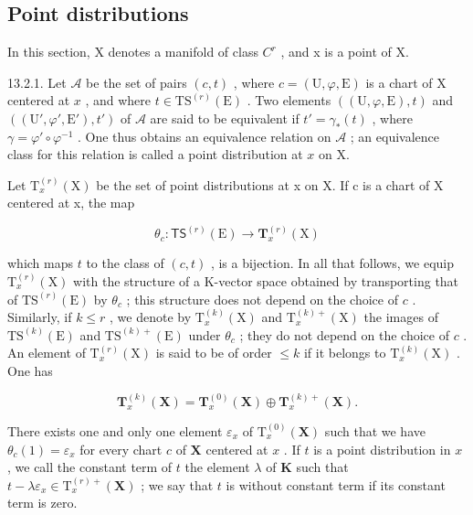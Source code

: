 \subsection{Point distributions}

In this section, X denotes a manifold of class \(C^{r}\) , and x is a point of X.

13.2.1. Let \(\mathcal{A}\) be the set of pairs \((c, t)\) , where \(c = (\mathrm{U}, \varphi, \mathrm{E})\) is a chart of X centered at \(x\) , and where \(t \in \mathrm{TS}^{(r)}(\mathrm{E})\) . Two elements \(((\mathrm{U}, \varphi, \mathrm{E}), t)\) and \(((\mathrm{U}', \varphi', \mathrm{E}'), t')\) of \(\mathcal{A}\) are said to be equivalent if \(t' = \gamma_*(t)\) , where \(\gamma = \varphi' \circ \varphi^{-1}\) . One thus obtains an equivalence relation on \(\mathcal{A}\) ; an equivalence class for this relation is called a point distribution at \(x\) on X.

Let \(\mathrm{T}_{x}^{(r)}(\mathrm{X})\) be the set of point distributions at x on X. If c is a chart of X centered at x, the map

\[
\theta_ {c} \colon \mathsf {T S} ^ {(r)} (\mathrm{E}) \to \mathbf {T} _ {x} ^ {(r)} (\mathrm{X})
\]

which maps \(t\) to the class of \((c, t)\) , is a bijection. In all that follows, we equip \(\mathrm{T}_{x}^{(r)}(\mathrm{X})\) with the structure of a K-vector space obtained by transporting that of \(\mathrm{TS}^{(r)}(\mathrm{E})\) by \(\theta_{c}\) ; this structure does not depend on the choice of \(c\) . Similarly, if \(k \leqslant r\) , we denote by \(\mathrm{T}_{x}^{(k)}(\mathrm{X})\) and \(\mathrm{T}_{x}^{(k)+}(\mathrm{X})\) the images of \(\mathrm{TS}^{(k)}(\mathrm{E})\) and \(\mathrm{TS}^{(k)+}(\mathrm{E})\) under \(\theta_{c}\) ; they do not depend on the choice of \(c\) . An element of \(\mathrm{T}_{x}^{(r)}(\mathrm{X})\) is said to be of order \(\leqslant k\) if it belongs to \(\mathrm{T}_{x}^{(k)}(\mathrm{X})\) . One has

\[
\mathbf {T} _ {x} ^ {(k)} (\mathbf {X}) = \mathbf {T} _ {x} ^ {(0)} (\mathbf {X}) \oplus \mathbf {T} _ {x} ^ {(k) +} (\mathbf {X}).
\]

There exists one and only one element \(\varepsilon_x\) of \(\mathrm{T}_x^{(0)}(\mathbf{X})\) such that we have \(\theta_c(1) = \varepsilon_x\) for every chart \(c\) of \(\mathbf{X}\) centered at \(x\) . If \(t\) is a point distribution in \(x\) , we call the constant term of \(t\) the element \(\lambda\) of \(\mathbf{K}\) such that \(t - \lambda \varepsilon_x \in \mathrm{T}_x^{(r)+}(\mathbf{X})\) ; we say that \(t\) is without constant term if its constant term is zero.

